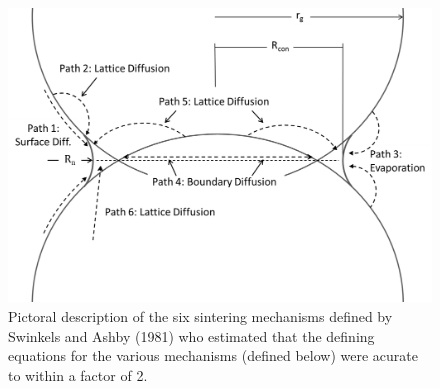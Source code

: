 \documentclass[11pt]{article} %
\begin{document}
	\begin{figure}
	\centering
		\includegraphics[scale=0.5]{Swinkels1981_DiffMech.png}
	\caption{Pictoral description of the six sintering mechanisms defined by Swinkels and Ashby (1981) who estimated that the defining equations for the various mechanisms (defined below) were acurate to within a factor of 2.}
	\label{fig:diffmech}
	\end{figure}
	
\end{document}
